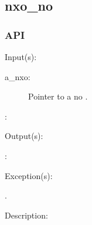 %
%
%
%
%              

\subsection{nxo\_no}
\label{nxo_no}

\subsubsection{API}
\begin{capi}
\label{nxo_no_}
	\begin{capilist}
	\item[Input(s): ]
		\begin{description}\item[]
		\item[a\_nxo: ]
			Pointer to a no .
		\item[: ]
		\end{description}
	\item[Output(s): ]
		\begin{description}\item[]
		\item[: ]
		\end{description}
	\item[Exception(s): ]
		\begin{description}\item[]
		\item[.]
		\end{description}
	\item[Description: ]
	\end{capilist}
\end{capi}
